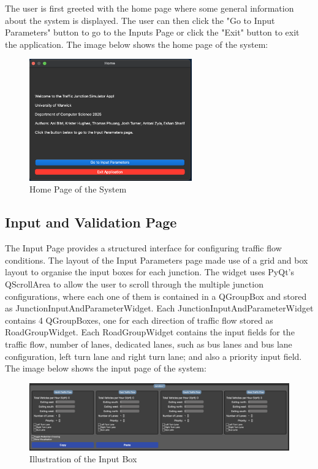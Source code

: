 \documentclass{article}
\begin{document}
        The user is first greeted with the home page where some general information about the system is displayed. The user can then click the "Go to Input Parameters" button to go to the Inputs Page 
        or click the "Exit" button to exit the application. The image below shows the home page of the system:

        \begin{figure}[H]
            \centering
            \includegraphics[width=7cm]{homepage.png}
            \caption{Home Page of the System}
            \label{fig:homepage}
        \end{figure}
    
    \subsection{Input and Validation Page}

        The Input Page provides a structured interface for configuring traffic flow conditions. The layout of the Input Parameters page made use of a grid and box layout to organise the input boxes for each junction. The widget uses PyQt's QScrollArea to allow the user to scroll through the multiple junction configurations, where each one of them 
        is contained in a QGroupBox and stored as JunctionInputAndParameterWidget. Each JunctionInputAndParameterWidget contains 4 QGroupBoxes, one for each direction of traffic flow stored as RoadGroupWidget. Each RoadGroupWidget contains the input fields for the 
        traffic flow, number of lanes, dedicated lanes, such as bus lanes and bus lane configuration, left turn lane and right turn lane; and also a priority input field. The image below shows the input page of the system:
        
        \begin{figure}[h!]
            \centering
            \includegraphics[width=\textwidth]{parameter.png}
            \caption{Illustration of the Input Box}
            \label{fig:parameter}
        \end{figure}
\end{document}
